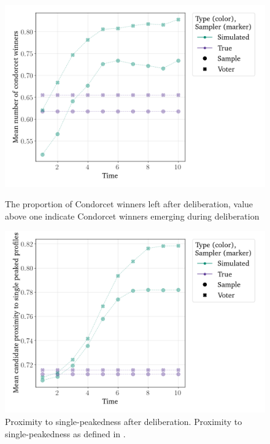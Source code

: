 \begin{figure}[htbp]
	\vspace{1em}

	\begin{minipage}{0.45\textwidth}
		\centering
		\includegraphics[width=\textwidth]{Figures/delib_Mean number of Condorcet winners.png}
		\caption{The proportion of Condorcet winners left after deliberation, value above one indicate Condorcet winners emerging during deliberation}
		\label{fig:degroot_condorcet}
	\end{minipage}\hfill
	\begin{minipage}{0.45\textwidth}
		\centering
		\vspace{-9pt}
		\includegraphics[width=\textwidth]{Figures/delib_Mean candidate proximity to single peaked Profiles.png}
		\caption{Proximity to single-peakedness after deliberation. Proximity to single-peakedness as defined in .}
		\label{fig:degroot_single_peaked}
	\end{minipage}
\end{figure}


